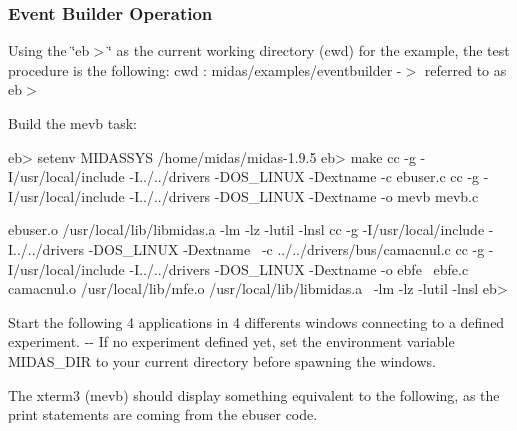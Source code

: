 \hypertarget{FE_Event_Builder_FE_eb_Operation}{}\subsubsection{Event Builder Operation}\label{FE_Event_Builder_FE_eb_Operation}
Using the \char`\"{}eb$>$\char`\"{} as the current working directory (cwd) for the example, the test procedure is the following: cwd : midas/examples/eventbuilder -\/$>$ referred to as eb$>$


\begin{DoxyItemize}
\item Build the mevb task: 
\begin{DoxyCode}
eb> setenv MIDASSYS /home/midas/midas-1.9.5
eb> make
cc  -g -I/usr/local/include -I../../drivers -DOS_LINUX -Dextname -c ebuser.c
cc  -g -I/usr/local/include -I../../drivers -DOS_LINUX -Dextname -o mevb mevb.c \
      
          ebuser.o /usr/local/lib/libmidas.a  -lm -lz -lutil -lnsl
cc  -g -I/usr/local/include -I../../drivers -DOS_LINUX -Dextname \
          -c ../../drivers/bus/camacnul.c
cc  -g -I/usr/local/include -I../../drivers -DOS_LINUX -Dextname -o ebfe \
        ebfe.c camacnul.o /usr/local/lib/mfe.o /usr/local/lib/libmidas.a \
        -lm -lz -lutil -lnsl
eb>
\end{DoxyCode}

\item Start the following 4 applications in 4 differents windows connecting to a defined experiment. -\/-\/ If no experiment defined yet, set the environment variable MIDAS\_\-DIR to your current directory before spawning the windows. 

\end{DoxyItemize}


\begin{DoxyItemize}
\item The xterm3 (mevb) should display something equivalent to the following, as the print statements are coming from the ebuser code.
\end{DoxyItemize}

